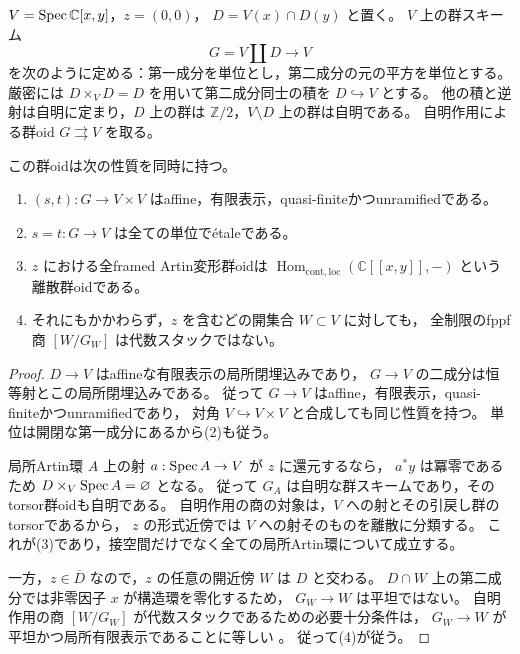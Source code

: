 \begin{example}[消える安定化群とfullな商の障害]
\label{ex:formal-versality-not-open}
$V=\operatorname{Spec}\mathbb C[x,y]$，$z=(0,0)$，
$D=V(x)\cap D(y)$ と置く。
$V$ 上の群スキーム
\[
          G=V\amalg D\longrightarrow V
\]
を次のように定める：第一成分を単位とし，第二成分の元の平方を単位とする。
厳密には $D\times_VD=D$ を用いて第二成分同士の積を $D\hookrightarrow V$ とする。
他の積と逆射は自明に定まり，$D$ 上の群は $\mathbb Z/2$，$V\setminus D$ 上の群は自明である。
自明作用による群oid $G\rightrightarrows V$ を取る。

この群oidは次の性質を同時に持つ。
\begin{enumerate}
\item $(s,t):G\to V\times V$ はaffine，有限表示，quasi-finiteかつunramifiedである。
\item $s=t:G\to V$ は全ての単位で\'{e}taleである。
\item $z$ における全framed Artin変形群oidは
      $\operatorname{Hom}_{\mathrm{cont},\mathrm{loc}}(\mathbb C[[x,y]],-)$ という離散群oidである。
\item それにもかかわらず，$z$ を含むどの開集合 $W\subset V$ に対しても，
      全制限のfppf商 $[W/G_W]$ は代数スタックではない。
\end{enumerate}
\end{example}
\begin{proof}
$D\to V$ はaffineな有限表示の局所閉埋込みであり，
$G\to V$ の二成分は恒等射とこの局所閉埋込みである。
従って $G\to V$ はaffine，有限表示，quasi-finiteかつunramifiedであり，
対角 $V\hookrightarrow V\times V$ と合成しても同じ性質を持つ。
単位は開閉な第一成分にあるから(2)も従う。

局所Artin環 $A$ 上の射 $a:\operatorname{Spec} A\to V$ が $z$ に還元するなら，
$a^*y$ は冪零であるため $D\times_V\operatorname{Spec} A=\varnothing$ となる。
従って $G_A$ は自明な群スキームであり，そのtorsor群oidも自明である。
自明作用の商の対象は，$V$ への射とその引戻し群のtorsorであるから，
$z$ の形式近傍では $V$ への射そのものを離散に分類する。
これが(3)であり，接空間だけでなく全ての局所Artin環について成立する。

一方，$z\in\overline D$ なので，$z$ の任意の開近傍 $W$ は $D$ と交わる。
$D\cap W$ 上の第二成分では非零因子 $x$ が構造環を零化するため，
$G_W\to W$ は平坦ではない。
自明作用の商 $[W/G_W]$ が代数スタックであるための必要十分条件は，
$G_W\to W$ が平坦かつ局所有限表示であることに等しい
\cite[Tag 06PL]{StacksProject}。
従って(4)が従う。
\end{proof}

